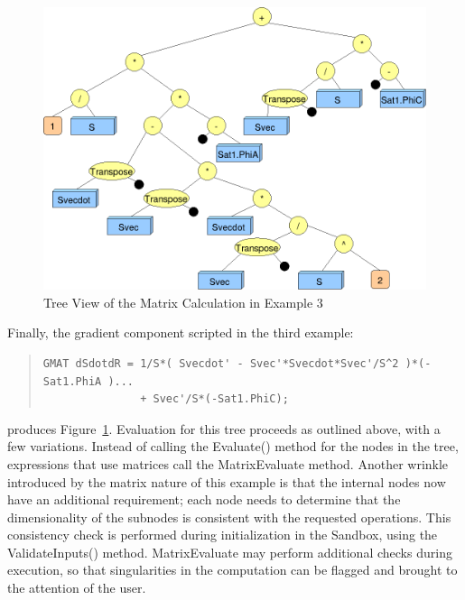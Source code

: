 \begin{figure}[tb]
\begin{center}
\includegraphics[430,318]{Images/MatrixExample.png}
\caption{\label{figure:matrixMathTree}Tree View of the Matrix Calculation in
Example 3}
\end{center}
\end{figure}

Finally, the gradient component scripted in the third example:

\begin{quote}\begin{verbatim}
GMAT dSdotdR = 1/S*( Svecdot' - Svec'*Svecdot*Svec'/S^2 )*(- Sat1.PhiA )...
               + Svec'/S*(-Sat1.PhiC);
\end{verbatim}\end{quote}

\noindent produces Figure~\ref{figure:matrixMathTree}.  Evaluation for this tree proceeds as
outlined above, with a few variations.  Instead of calling the Evaluate() method for the nodes in
the tree, expressions that use matrices call the MatrixEvaluate method.  Another wrinkle introduced
by the matrix nature of this example is that the internal nodes now have an additional requirement;
each node needs to determine that the dimensionality of the subnodes is consistent with the
requested operations.  This consistency check is performed during initialization in the Sandbox,
using the ValidateInputs() method.
MatrixEvaluate may perform additional checks during execution, so that
singularities in the computation can be flagged and brought to the attention of the user.

